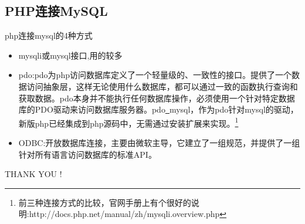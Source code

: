 \documentclass[CJK]{beamer}
\begin{document}
\begin{CJK*}{UTF8}{gbsn}
\subsection{PHP连接MySQL}
\begin{frame}{php连接mysql的4种方式}
	\begin{itemize}
		\item mysqli或mysql接口,用的较多
		\item pdo:{\tiny pdo为php访问数据库定义了一个轻量级的、一致性的接口。提供了一个数据访问抽象层，这样无论使用什么数据库，都可以通过一致的函数执行查询和获取数据。pdo本身并不能执行任何数据库操作，必须使用一个针对特定数据库的PDO驱动来访问数据库服务器。pdo\underline{\ }mysql，作为pdo针对mysql的驱动，新版php已经集成到php源码中，无需通过安装扩展来实现。}\footnote{\tiny 前三种连接方式的比较，官网手册上有个很好的说明:http://docs.php.net/manual/zh/mysqli.overview.php}
		\item ODBC:开放数据库连接，主要由微软主导，它建立了一组规范，并提供了一组针对所有语言访问数据库的标准API。
	\end{itemize}
\end{frame}
\begin{frame}
	\begin{center}
	{\LARGE THANK YOU !}
	\end{center}
\end{frame}
\end{CJK*}
\end{document}
